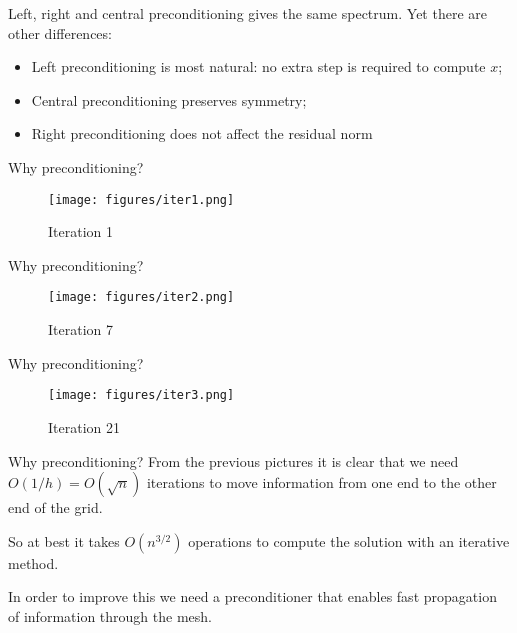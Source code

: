 \begin{frame}
  Left, right and central preconditioning gives the same spectrum.
  Yet there are other differences:
  \begin{itemize}
  \item  Left preconditioning is most natural: no extra step is
required to compute $x$;
\item Central preconditioning preserves symmetry;
\item Right preconditioning does not affect the residual norm

  \end{itemize}
\end{frame}

\begin{frame}{Why preconditioning?}
  \begin{figure}[h]
    \centering
  \texttt{[image: figures/iter1.png]}
    \caption{Iteration 1}
    \label{fig:1}
  \end{figure}

\end{frame}

\begin{frame}{Why preconditioning?}
  \begin{figure}[h]
    \centering
  \texttt{[image: figures/iter2.png]}
    \caption{Iteration 7}
    \label{fig:2}
  \end{figure}

\end{frame}
\begin{frame}{Why preconditioning?}
  \begin{figure}[h]
    \centering
  \texttt{[image: figures/iter3.png]}
    \caption{Iteration 21}
    \label{fig:3}
  \end{figure}

\end{frame}


\begin{frame}{Why preconditioning?}
  From the previous pictures it is clear that we need
$O(1/h) = O(\sqrt{n})$ iterations to move information from one end to
the other end of the grid.

So at best it takes $O(n^{3/2})$ operations to compute the solution
with an iterative method.

In order to improve this we need a preconditioner that enables
fast propagation of information through the mesh.
\end{frame}
